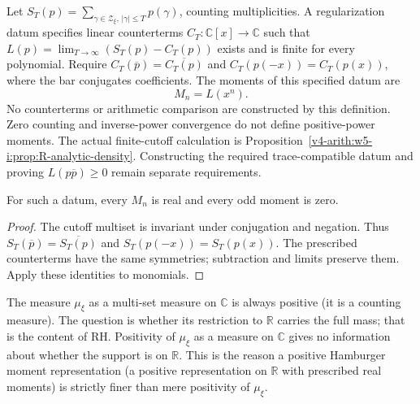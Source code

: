 \begin{definition}
\label{v4-arith:w5-j:def:moment-sequence}
Let \(S_T(p)=\sum_{\gamma\in\mathcal Z_\xi,\,|\gamma|\le T}p(\gamma)\),
counting multiplicities. A regularization datum specifies linear
counterterms \(C_T:\mathbb C[x]\to\mathbb C\) such that
\(L(p)=\lim_{T\to\infty}(S_T(p)-C_T(p))\) exists and is finite
for every polynomial. Require
\(C_T(\overline p)=\overline{C_T(p)}\) and
\(C_T(p(-x))=C_T(p(x))\), where the bar conjugates coefficients.
The moments of this specified datum are
\begin{equation}
\label{v4-arith:w5-j:eq:moment-def}
 M_n=L(x^n).
\end{equation}
No counterterms or arithmetic comparison are constructed by this
definition. Zero counting and inverse-power convergence do not
define positive-power moments. The actual finite-cutoff calculation
is Proposition~\ref{v4-arith:w5-i:prop:R-analytic-density}.
Constructing the required trace-compatible datum and proving
\(L(p\overline p)\ge0\) remain separate requirements.
\end{definition}
\begin{proposition}
\label{v4-arith:w5-j:prop:moments-real}
For such a datum, every \(M_n\) is real and every odd moment is zero.
\end{proposition}
\begin{proof}
The cutoff multiset is invariant under conjugation and negation.
Thus \(S_T(\overline p)=\overline{S_T(p)}\) and
\(S_T(p(-x))=S_T(p(x))\). The prescribed counterterms have the
same symmetries; subtraction and limits preserve them. Apply these
identities to monomials.
\end{proof}

\begin{remark}
\label{v4-arith:w5-j:rem:positivity-weaker-than-RH}
The measure \(\mu_{\xi}\) as a multi-set measure on \(\mathbb{C}\) is
always positive (it is a counting measure). The question is
whether its restriction to \(\mathbb{R}\) carries the full mass; that
is the content of RH. Positivity of \(\mu_{\xi}\) as a measure on
\(\mathbb{C}\) gives no information about whether the support is on
\(\mathbb{R}\). This is the reason a positive Hamburger
moment representation (a positive representation on \(\mathbb{R}\)
with prescribed real moments) is strictly finer than mere
positivity of \(\mu_{\xi}\).
\end{remark}

